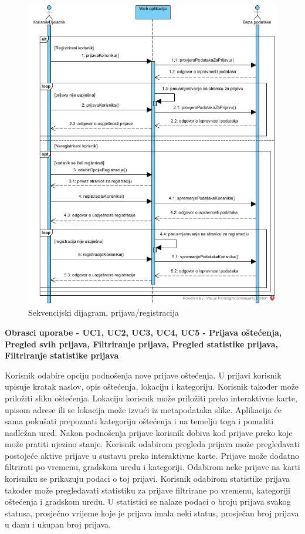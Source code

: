 				\begin{figure}[H]
					\includegraphics[width=\textwidth]{slike/Prijava_registracijaSD.jpg} %
					\caption{Sekvencijski dijagram, prijava/registracija}
					\label{fig:sekvencijskiDijagram1} %
				\end{figure}
				\eject
				
				\textbf{Obrasci uporabe - UC1, UC2, UC3, UC4, UC5 - Prijava oštećenja, Pregled svih prijava, Filtriranje prijava, Pregled statistike prijava, Filtriranje statistike prijava}
				
				Korisnik odabire opciju podnošenja nove prijave oštećenja. U prijavi korisnik upisuje kratak naslov, opis oštećenja, lokaciju i kategoriju. Korisnik također može priložiti sliku oštećenja. Lokaciju korisnik može priložiti preko interaktivne karte, upisom adrese ili se lokacija može izvući iz metapodataka slike. Aplikacija će sama pokušati prepoznati kategoriju oštećenja i na temelju toga i ponuditi nadležan ured. Nakon podnošenja prijave korisnik dobiva kod prijave preko koje može pratiti njezino stanje. 
				Korisnik odabirom pregleda prijava može pregledavati postojeće aktive prijave u sustavu preko interaktivne karte. Prijave može dodatno filtrirati po vremenu, gradskom uredu i kategoriji. Odabirom neke prijave na karti korisniku se prikazuju podaci o toj prijavi.
				Korisnik odabirom statistike prijava također može pregledavati statistiku za prijave filtrirane po vremenu, kategoriji oštećenja i gradskom uredu. U statistici se nalaze podaci o broju prijava svakog statusa, prosječno vrijeme koje je prijava imala neki status, prosječan broj prijava u danu i ukupan broj prijava.
				
